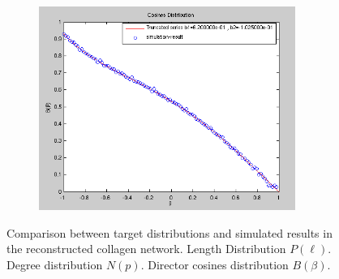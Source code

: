 \begin{figure}[h!]
\begin{subfigure}{0.32\textwidth}
    \includegraphics[width=0.92\textwidth]{Figures/chapter-reconstruct/cosinesN10000.png}%
    \label{collagen_cosines}
  \end{subfigure}

\caption[Collagen: comparing target and simulated distributions]{ Comparison
between target distributions and simulated results in the reconstructed collagen
network.
 Length Distribution $P(\ell)$.
 Degree distribution $N(p)$.
 Director cosines distribution $B(\beta)$.
}
\label{fig:collagen-distributions}
\end{figure}

%
%
%
